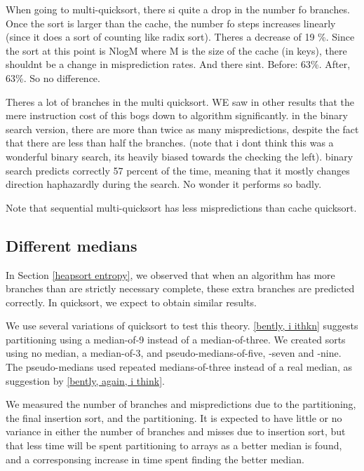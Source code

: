 When going to multi-quicksort, there si quite a drop in the number fo branches.
Once the sort is larger than the cache, the number fo steps increases linearly
(since it does a sort of counting like radix sort). Theres a decrease of 19 \%.
Since the sort at this point is NlogM where M is the size of the cache (in
keys), there shouldnt be a change in misprediction rates. And there sint.
Before: 63\%. After, 63\%. So no difference.

Theres a lot of branches in the multi quicksort. WE saw in other results that
the mere instruction cost of this bogs down to algorithm significantly. in the
binary search version, there are more than twice as many mispredictions,
despite the fact that there are less than half the branches. (note that i dont
think this was a wonderful binary search, its heavily biased towards the
checking the left). binary search predicts correctly 57 percent of the time,
meaning that it mostly changes direction haphazardly during the search. No
wonder it performs so badly.

Note that sequential multi-quicksort has less mispredictions than cache quicksort.


\subsection{Different medians}

\label{quick-predictors2}

\label{quicksort entropy}

In Section \ref{heapsort entropy}, we observed that when an algorithm has more
branches than are strictly necessary complete, these extra branches are
predicted correctly. In quicksort, we expect to obtain similar results.


We use several variations of quicksort to test this theory. \ref{bently, i
ithkn} suggests partitioning using a median-of-9 instead of a median-of-three. We
created sorts using no median, a median-of-3, and pseudo-medians-of-five, -seven and
-nine. The pseudo-medians used repeated medians-of-three instead of a real
median, as suggestion by \ref{bently, again, i think}. 

We measured the number of branches and mispredictions due to the partitioning,
the final insertion sort, and the partitioning. It is expected to have little or
no variance in either the number of branches and misses due to insertion sort,
but that less time will be spent partitioning to arrays as a better median is
found, and a corresponsing increase in time spent finding the better median.

